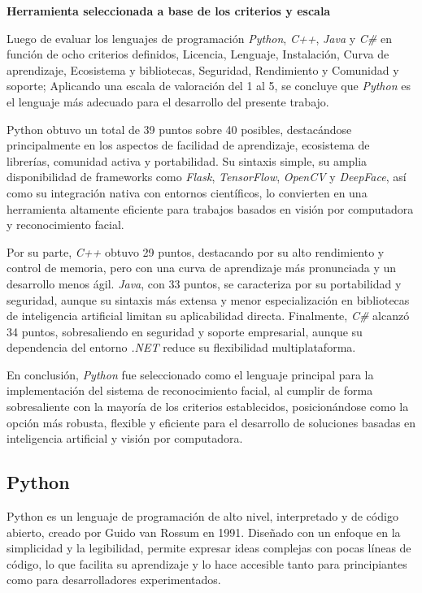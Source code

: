 \textbf{Herramienta seleccionada a base de los criterios y escala}

Luego de evaluar los lenguajes de programación \textit{Python}, \textit{C++}, \textit{Java} y \textit{C\#} en función de ocho criterios definidos, Licencia, Lenguaje, Instalación, Curva de aprendizaje, Ecosistema y bibliotecas, Seguridad, Rendimiento y Comunidad y soporte; Aplicando una escala de valoración del 1 al 5, se concluye que \textit{Python} es el lenguaje más adecuado para el desarrollo del presente trabajo.

Python obtuvo un total de 39 puntos sobre 40 posibles, destacándose principalmente en los aspectos de facilidad de aprendizaje, ecosistema de librerías, comunidad activa y portabilidad. Su sintaxis simple, su amplia disponibilidad de frameworks como \textit{Flask}, \textit{TensorFlow}, \textit{OpenCV} y \textit{DeepFace}, así como su integración nativa con entornos científicos, lo convierten en una herramienta altamente eficiente para trabajos basados en visión por computadora y reconocimiento facial.  

Por su parte, \textit{C++} obtuvo 29 puntos, destacando por su alto rendimiento y control de memoria, pero con una curva de aprendizaje más pronunciada y un desarrollo menos ágil. \textit{Java}, con 33 puntos, se caracteriza por su portabilidad y seguridad, aunque su sintaxis más extensa y menor especialización en bibliotecas de inteligencia artificial limitan su aplicabilidad directa. Finalmente, \textit{C\#} alcanzó 34 puntos, sobresaliendo en seguridad y soporte empresarial, aunque su dependencia del entorno \textit{.NET} reduce su flexibilidad multiplataforma.

En conclusión, \textit{Python} fue seleccionado como el lenguaje principal para la implementación del sistema de reconocimiento facial, al cumplir de forma sobresaliente con la mayoría de los criterios establecidos, posicionándose como la opción más robusta, flexible y eficiente para el desarrollo de soluciones basadas en inteligencia artificial y visión por computadora.

\subsection{Python}

Python es un lenguaje de programación de alto nivel, interpretado y de código abierto, creado por Guido van Rossum en 1991. Diseñado con un enfoque en la simplicidad y la legibilidad, permite expresar ideas complejas con pocas líneas de código, lo que facilita su aprendizaje y lo hace accesible tanto para principiantes como para desarrolladores experimentados\cite{python}.  

